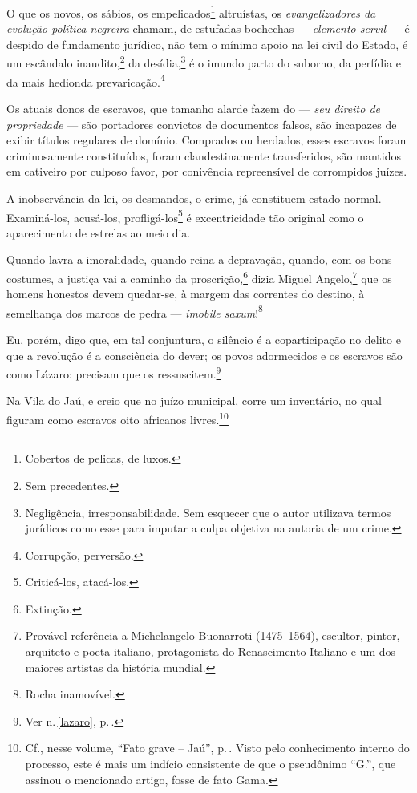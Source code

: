 {O que os novos, os sábios, os empelicados\footnote{Cobertos de
  pelicas, de luxos.} altruístas, os \emph{evangelizadores da evolução
política negreira} chamam, de estufadas bochechas --- \emph{elemento %
servil} --- é despido de fundamento jurídico, não tem o mínimo apoio na
lei civil do Estado, é um escândalo inaudito,\footnote{Sem precedentes.}
da desídia,\footnote{Negligência, irresponsabilidade. Sem esquecer que
  o autor utilizava termos jurídicos como esse para imputar a culpa
  objetiva na autoria de um crime.} é o imundo parto do suborno, da
perfídia e da mais hedionda prevaricação.\footnote{Corrupção,
  perversão.}

Os atuais donos de escravos, que tamanho alarde fazem do --- \emph{seu %
direito de propriedade} --- são portadores convictos de documentos
falsos, são incapazes de exibir títulos regulares de domínio. Comprados
ou herdados, esses escravos foram criminosamente constituídos, foram
clandestinamente transferidos, são mantidos em cativeiro por culposo
favor, por conivência repreensível de corrompidos juízes.

A inobservância da lei, os desmandos, o crime, já constituem estado
normal. Examiná-los, acusá-los, profligá-los\footnote{Criticá-los,
  atacá-los.} é excentricidade tão original como o aparecimento de
estrelas ao meio dia.

Quando lavra a imoralidade, quando reina a depravação, quando, com os
bons costumes, a justiça vai a caminho da proscrição,\footnote{Extinção.}
dizia Miguel Angelo,\footnote{Provável referência a Michelangelo
  Buonarroti (1475--1564), escultor, pintor, arquiteto e poeta italiano,
  protagonista do Renascimento Italiano e um dos maiores artistas da
  história mundial.} que os homens honestos devem quedar-se, à margem
das correntes do destino, à semelhança dos marcos de pedra ---
\emph{ímobile saxum}!\footnote{Rocha inamovível.}

Eu, porém, digo que, em tal conjuntura, o silêncio é a coparticipação no
delito e que a revolução é a consciência do dever; os povos adormecidos
e os escravos são como Lázaro: precisam que os ressuscitem.\footnote{Ver n.\,\ref{lazaro}, p.\,\pageref{lazaro}.}

Na Vila do Jaú, e creio que no juízo municipal, corre um inventário, no
qual figuram como escravos oito africanos livres.\footnote{Cf., nesse
  volume, ``Fato grave -- Jaú'', p.\,\pageref{jau}. Visto pelo conhecimento
  interno do processo, este é mais um indício consistente de que o
  pseudônimo ``G.'', que assinou o mencionado artigo, fosse de fato Gama.}

}
